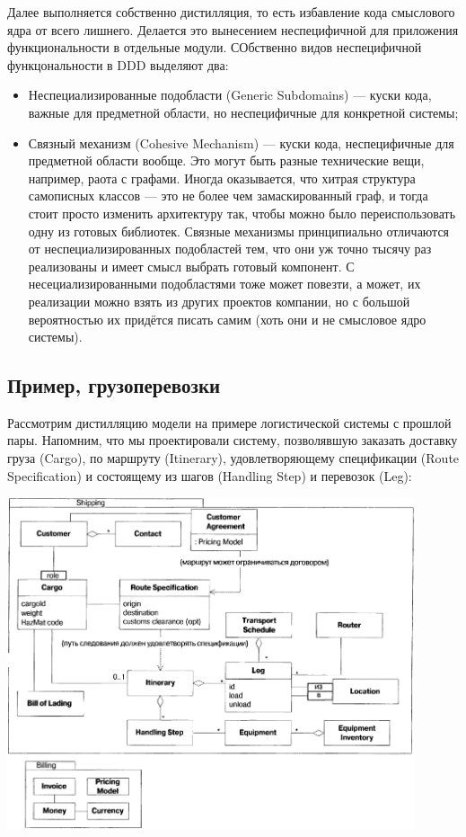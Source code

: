 \documentclass[a5paper]{article}
\begin{document}
Далее выполняется собственно дистилляция, то есть избавление кода смыслового ядра от всего лишнего. Делается это вынесением неспецифичной для приложения функциональности в отдельные модули. СОбственно видов неспецифичной функцональности в DDD выделяют два:

\begin{itemize}
    \item Неспециализированные подобласти (Generic Subdomains) --- куски кода, важные для предметной области, но неспецифичные для конкретной системы;
    \item Связный механизм (Cohesive Mechanism) --- куски кода, неспецифичные для предметной области вообще. Это могут быть разные технические вещи, например, раота с графами. Иногда оказывается, что хитрая структура самописных классов --- это не более чем замаскированный граф, и тогда стоит просто изменить архитектуру так, чтобы можно было переиспользовать одну из готовых библиотек. Связные механизмы принципиально отличаются от неспециализированных подобластей тем, что они уж точно тысячу раз реализованы и имеет смысл выбрать готовый компонент. С несециализированными подобластями тоже может повезти, а может, их реализации можно взять из других проектов компании, но с большой вероятностью их придётся писать самим (хоть они и не смысловое ядро системы).
\end{itemize}

\subsection{Пример, грузоперевозки}

Рассмотрим дистилляцию модели на примере логистической системы с прошлой пары. Напомним, что мы проектировали систему, позволявшую заказать доставку груза (Cargo), по маршруту (Itinerary), удовлетворяющему спецификации (Route Specification) и состоящему из шагов (Handling Step) и перевозок (Leg):

\begin{center}
    \includegraphics[width=0.9\textwidth]{shippingRaw.png}
\end{center}
\end{document}
